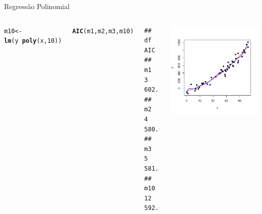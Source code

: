 \documentclass{beamer}\usepackage[]{graphicx}\usepackage[]{color}
\makeatletter
\newcommand{\hlnum}[1]{\textcolor[rgb]{0.686,0.059,0.569}{#1}}%
\newcommand{\hlopt}[1]{\textcolor[rgb]{0,0,0}{#1}}%
\newcommand{\hlstd}[1]{\textcolor[rgb]{0.345,0.345,0.345}{#1}}%
\newcommand{\hlkwb}[1]{\textcolor[rgb]{0.69,0.353,0.396}{#1}}%
\newcommand{\hlkwd}[1]{\textcolor[rgb]{0.737,0.353,0.396}{\textbf{#1}}}%
\newenvironment{kframe}{%
 \def\at@end@of@kframe{}%
 \ifinner\ifhmode%
  \def\at@end@of@kframe{\end{minipage}}%
  \begin{minipage}{\columnwidth}%
 \fi\fi%
 \def\FrameCommand##1{\hskip\@totalleftmargin \hskip-\fboxsep
 \colorbox{shadecolor}{##1}\hskip-\fboxsep
     \hskip-\linewidth \hskip-\@totalleftmargin \hskip\columnwidth}%
 \MakeFramed {\advance\hsize-\width
   \@totalleftmargin\z@ \linewidth\hsize
   \@setminipage}}%
 {\par\unskip\endMakeFramed%
 \at@end@of@kframe}
\newenvironment{knitrout}{}{} %
\renewenvironment{knitrout}{\setlength{\topsep}{0mm}}{}
\makeatother
\begin{document}
\begin{frame}[fragile]{Regressão Polinomial}

\begin{columns}

\setlength{\topsep}{2pt}

\begin{knitrout}\tiny
{}\color{fgcolor}\begin{kframe}
\begin{alltt}
\hlstd{m10} \hlkwb{<-} \hlkwd{lm}\hlstd{(y} \hlopt{~}\hlkwd{poly}\hlstd{(x,}\hlnum{10}\hlstd{))}

\hlkwd{AIC}\hlstd{(m1,m2,m3,m10)}
\end{alltt}
\begin{verbatim}
##     df      AIC
## m1   3 602.9227
## m2   4 580.6495
## m3   5 581.8052
## m10 12 592.0629
\end{verbatim}
\end{kframe}
\end{knitrout}


\begin{knitrout}
\color{fgcolor}
\includegraphics[width=1\linewidth]{figure/samppolallplot4-1} 

\end{knitrout}

\end{columns}

\end{frame}
\end{document}
